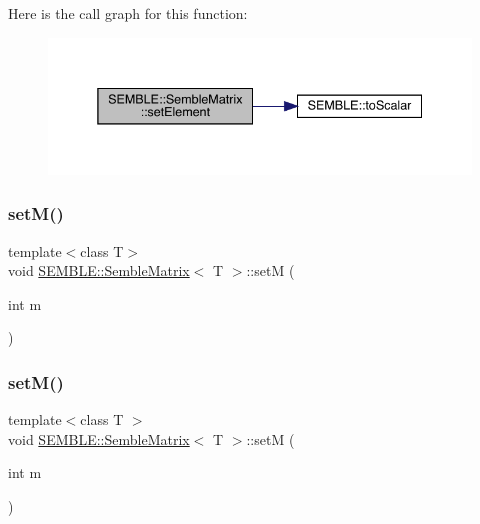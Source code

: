 Here is the call graph for this function\+:
\nopagebreak
\begin{figure}[H]
\begin{center}
\leavevmode
\includegraphics[width=338pt]{df/d87/structSEMBLE_1_1SembleMatrix_a5840aaaabbade4c2714f3bfd99d150a8_cgraph}
\end{center}
\end{figure}
\mbox{\label{structSEMBLE_1_1SembleMatrix_acbb4c25efd64633247fc6119a0d427ca}} 
\subsubsection{\texorpdfstring{setM()}{setM()}\hspace{0.1cm}{\footnotesize\ttfamily [1/2]}}
{\footnotesize\ttfamily template$<$class T$>$ \\
void \mbox{\hyperlink{structSEMBLE_1_1SembleMatrix}{S\+E\+M\+B\+L\+E\+::\+Semble\+Matrix}}$<$ T $>$\+::setM (\begin{DoxyParamCaption}\item[{int}]{m }\end{DoxyParamCaption})}

\mbox{\label{structSEMBLE_1_1SembleMatrix_acbb4c25efd64633247fc6119a0d427ca}} 
\subsubsection{\texorpdfstring{setM()}{setM()}\hspace{0.1cm}{\footnotesize\ttfamily [2/2]}}
{\footnotesize\ttfamily template$<$class T $>$ \\
void \mbox{\hyperlink{structSEMBLE_1_1SembleMatrix}{S\+E\+M\+B\+L\+E\+::\+Semble\+Matrix}}$<$ T $>$\+::setM (\begin{DoxyParamCaption}\item[{int}]{m }\end{DoxyParamCaption})}

